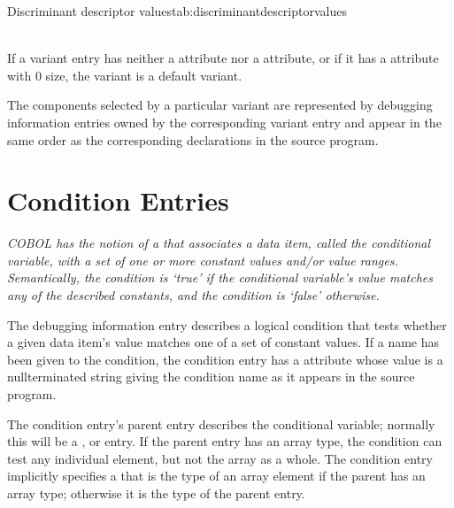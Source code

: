 \begin{simplenametable}[1.4in]{Discriminant descriptor values}{tab:discriminantdescriptorvalues}
\DWDSClabelTARG{} \\
\DWDSCrangeTARG{} \\
\end{simplenametable}

If a variant entry has neither a \DWATdiscrvalue{}
attribute nor a \DWATdiscrlist{} attribute, or if it has
a \DWATdiscrlist{} attribute with 0 size, the variant is a
default variant.

The components selected by a particular variant are represented
by debugging information entries owned by the corresponding
variant entry and appear in the same order as the corresponding
declarations in the source program.

\section{Condition Entries}
\label{chap:conditionentries}

\textit{COBOL has the notion of 
a  that
associates a data item, called the conditional variable, with
a set of one or more constant values and/or value ranges.
Semantically, the condition is \textquoteleft true\textquoteright{}
if the conditional
variable's value matches any of the described constants,
and the condition is \textquoteleft false\textquoteright{} otherwise.}

The \DWTAGconditionTARG{}
debugging information entry
describes a
logical condition that tests whether a given data item\textquoteright s
value matches one of a set of constant values. If a name
has been given to the condition, the condition entry has a
\DWATname{} attribute
whose value is a null\dash terminated string
giving the condition name as it appears in the source program.

The condition entry's parent entry describes the conditional
variable; normally this will be a \DWTAGvariable,
\DWTAGmember{} or 
\DWTAGformalparameter{} entry.
If 
the parent
entry has an array type, the condition can test any individual
element, but not the array as a whole. The condition entry
implicitly specifies a  that is the
type of an array element if the parent has an array type;
otherwise it is the type of the parent entry.

